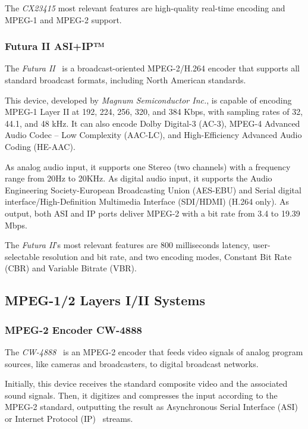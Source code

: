 The \textit{CX23415} most relevant features are high-quality real-time encoding and MPEG-1 and MPEG-2 support.

\subsubsection{Futura II ASI+IP™}

The \textit{Futura II}~\cite{futura} is a broadcast-oriented MPEG-2/H.264 encoder that supports all standard broadcast formats, including North American standards. 

This device, developed by \textit{Magnum Semiconductor Inc.}, is capable of encoding MPEG-1 Layer II at 192, 224, 256, 320, and 384 Kbps, with sampling rates of 32, 44.1, and 48 kHz. It can also encode Dolby Digital-3 (AC-3), MPEG-4 Advanced Audio Codec – Low Complexity (AAC-LC), and High-Efficiency Advanced Audio Coding (HE-AAC).

As analog audio input, it supports one Stereo (two channels) with a frequency range from 20Hz to 20KHz. As digital audio input, it supports the Audio Engineering Society-European Broadcasting Union (AES-EBU) and Serial digital interface/High-Definition Multimedia Interface (SDI/HDMI) (H.264 only).
As output, both ASI and IP ports deliver MPEG-2 with a bit rate from 3.4 to 19.39 Mbps.

The \textit{Futura II}'s most relevant features are 800 milliseconds latency, user-selectable resolution and bit rate, and two encoding modes, Constant Bit Rate (CBR) and Variable Bitrate (VBR).

\subsection{MPEG-1/2 Layers I/II Systems}

\subsubsection{MPEG-2 Encoder CW-4888}

The \textit{CW-4888}~\cite{cw4888} is an MPEG-2 encoder that feeds video signals of analog program sources, like cameras and broadcasters, to digital broadcast networks.

Initially, this device receives the standard composite video and the associated sound signals. Then, it digitizes and compresses the input according to the MPEG-2 standard, outputting the result as Asynchronous Serial Interface (ASI)~\cite{asi} or Internet Protocol (IP)~\cite{ip} streams.

